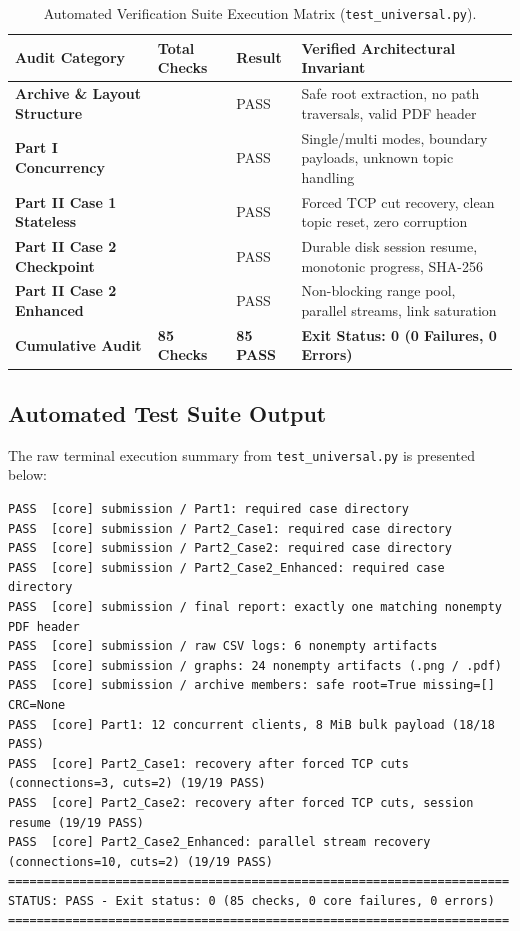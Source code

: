 \documentclass[11pt,a4paper]{article}
\begin{document}
\begin{table}[htbp]
\centering
\small
\renewcommand{\arraystretch}{1.15}
\begin{tabularx}{\textwidth}{>{\bfseries}p{4.4cm} >{\centering\arraybackslash}p{2.2cm} >{\centering\arraybackslash}p{2.2cm} X}
    \toprule
    \rowcolor{codebg}
    Audit Category & Total Checks & Result & Verified Architectural Invariant \\
    \midrule
    Archive \& Layout Structure  & 10 & 10 PASS & Safe root extraction, no path traversals, valid PDF header \\
    Part I Concurrency & 18 & 18 PASS & Single/multi modes, boundary payloads, unknown topic handling \\
    Part II Case 1 Stateless     & 19 & 19 PASS & Forced TCP cut recovery, clean topic reset, zero corruption \\
    Part II Case 2 Checkpoint    & 19 & 19 PASS & Durable disk session resume, monotonic progress, SHA-256 \\
    Part II Case 2 Enhanced      & 19 & 19 PASS & Non-blocking range pool, parallel streams, link saturation \\
    \midrule
    \rowcolor{lightbg}
    \textbf{Cumulative Audit}    & \textbf{85 Checks} & \textbf{85 PASS} & \textbf{Exit Status: 0 (0 Failures, 0 Errors)} \\
    \bottomrule
\end{tabularx}
\caption{Automated Verification Suite Execution Matrix (\texttt{test\_universal.py}).}
\label{tab:test_audit_summary}
\end{table}

\subsection{Automated Test Suite Output}
The raw terminal execution summary from \texttt{test\_universal.py} is presented below:

\begin{lstlisting}[basicstyle=\ttfamily\scriptsize]
PASS  [core] submission / Part1: required case directory
PASS  [core] submission / Part2_Case1: required case directory
PASS  [core] submission / Part2_Case2: required case directory
PASS  [core] submission / Part2_Case2_Enhanced: required case directory
PASS  [core] submission / final report: exactly one matching nonempty PDF header
PASS  [core] submission / raw CSV logs: 6 nonempty artifacts
PASS  [core] submission / graphs: 24 nonempty artifacts (.png / .pdf)
PASS  [core] submission / archive members: safe root=True missing=[] CRC=None
PASS  [core] Part1: 12 concurrent clients, 8 MiB bulk payload (18/18 PASS)
PASS  [core] Part2_Case1: recovery after forced TCP cuts (connections=3, cuts=2) (19/19 PASS)
PASS  [core] Part2_Case2: recovery after forced TCP cuts, session resume (19/19 PASS)
PASS  [core] Part2_Case2_Enhanced: parallel stream recovery (connections=10, cuts=2) (19/19 PASS)
======================================================================
STATUS: PASS - Exit status: 0 (85 checks, 0 core failures, 0 errors)
======================================================================
\end{lstlisting}
\end{document}
